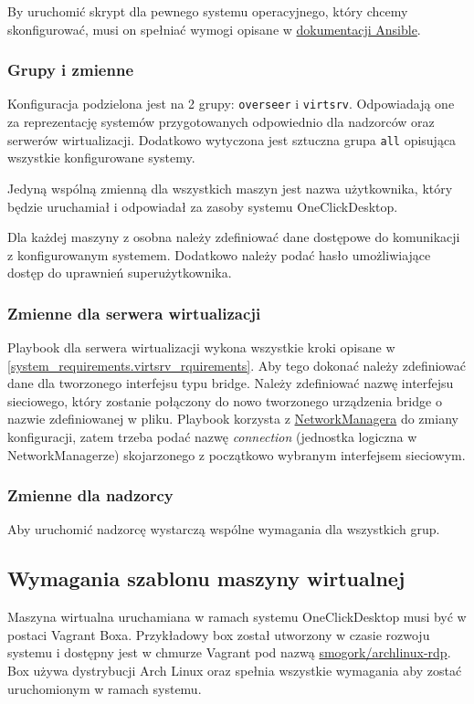 \documentclass[../opis-rozwiazania.tex]{subfiles}
\begin{document}
By uruchomić skrypt dla pewnego systemu operacyjnego, który chcemy skonfigurować, musi on spełniać wymogi opisane w \href{https://docs.ansible.com/ansible/latest/plugins/connection.html#connection-plugins}{dokumentacji Ansible}.

\subsubsection{Grupy i zmienne}
Konfiguracja podzielona jest na 2 grupy: \texttt{overseer} i \texttt{virtsrv}.
Odpowiadają one za reprezentację systemów przygotowanych odpowiednio dla nadzorców oraz serwerów wirtualizacji.
Dodatkowo wytyczona jest sztuczna grupa \texttt{all} opisująca wszystkie konfigurowane systemy.

Jedyną wspólną zmienną dla wszystkich maszyn jest nazwa użytkownika, który będzie uruchamiał i odpowiadał za zasoby systemu OneClickDesktop.

Dla każdej maszyny z osobna należy zdefiniować dane dostępowe do komunikacji z konfigurowanym systemem. Dodatkowo należy podać hasło umożliwiające dostęp do uprawnień superużytkownika.

\subsubsection{Zmienne dla serwera wirtualizacji}
Playbook dla serwera wirtualizacji wykona wszystkie kroki opisane w \ref{system_requirements.virtsrv_rquirements}.
Aby tego dokonać należy zdefiniować dane dla tworzonego interfejsu typu bridge.
Należy zdefiniować nazwę interfejsu sieciowego, który zostanie połączony do nowo tworzonego urządzenia bridge o nazwie zdefiniowanej w pliku.
Playbook korzysta z \href{https://networkmanager.dev/}{NetworkManagera} do zmiany konfiguracji, zatem trzeba podać nazwę \textit{connection} (jednostka logiczna w NetworkManagerze) skojarzonego z początkowo wybranym interfejsem sieciowym.

\subsubsection{Zmienne dla nadzorcy}
Aby uruchomić nadzorcę wystarczą wspólne wymagania dla wszystkich grup.

\subsection{Wymagania szablonu maszyny wirtualnej}
\label{system_requirements.vagrant_box}
Maszyna wirtualna uruchamiana w ramach systemu OneClickDesktop musi być w postaci Vagrant Boxa.
Przykładowy box został utworzony w czasie rozwoju systemu i dostępny jest w chmurze Vagrant pod nazwą \href{https://app.vagrantup.com/smogork/boxes/archlinux-rdp}{\url{smogork/archlinux-rdp}}.
Box używa dystrybucji Arch Linux oraz spełnia wszystkie wymagania aby zostać uruchomionym w ramach systemu.
\end{document}
